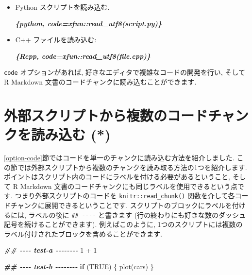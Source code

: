 \documentclass[
  11pt,
]{bxjsreport}
\newenvironment{Shaded}{\begin{snugshade}}{\end{snugshade}}
\newcommand{\ConstantTok}[1]{\textcolor[rgb]{0.00,0.00,0.00}{#1}}
\newcommand{\ControlFlowTok}[1]{\textcolor[rgb]{0.13,0.29,0.53}{\textbf{#1}}}
\newcommand{\DecValTok}[1]{\textcolor[rgb]{0.00,0.00,0.81}{#1}}
\newcommand{\DocumentationTok}[1]{\textcolor[rgb]{0.56,0.35,0.01}{\textbf{\textit{#1}}}}
\newcommand{\FunctionTok}[1]{\textcolor[rgb]{0.00,0.00,0.00}{#1}}
\newcommand{\InformationTok}[1]{\textcolor[rgb]{0.56,0.35,0.01}{\textbf{\textit{#1}}}}
\newcommand{\NormalTok}[1]{#1}
\newcommand{\SpecialCharTok}[1]{\textcolor[rgb]{0.00,0.00,0.00}{#1}}
\begin{document}
\begin{itemize}
\item
  Python スクリプトを読み込む.

\begin{Shaded}
\begin{Highlighting}[]
\InformationTok{\textasciigrave{}\textasciigrave{}\textasciigrave{}\{python, code=xfun::read\_utf8(\textquotesingle{}script.py\textquotesingle{})\}}
\InformationTok{\textasciigrave{}\textasciigrave{}\textasciigrave{}}
\end{Highlighting}
\end{Shaded}
\item
  C++ ファイルを読み込む:

\begin{Shaded}
\begin{Highlighting}[]
\InformationTok{\textasciigrave{}\textasciigrave{}\textasciigrave{}\{Rcpp, code=xfun::read\_utf8(\textquotesingle{}file.cpp\textquotesingle{})\}}
\InformationTok{\textasciigrave{}\textasciigrave{}\textasciigrave{}}
\end{Highlighting}
\end{Shaded}
\end{itemize}

\texttt{code} オプションがあれば, 好きなエディタで複雑なコードの開発を行い, そして R Markdown 文書のコードチャンクに読み込むことができます.

\hypertarget{read-chunk}{%
\section{外部スクリプトから複数のコードチャンクを読み込む (*)}\label{read-chunk}}

\ref{option-code}節ではコードを単一のチャンクに読み込む方法を紹介しました. この節では外部スクリプトから複数のチャンクを読み取る方法の1つを紹介します. ポイントはスクリプト内のコードにラベルを付ける必要があるということ, そして R Markdown 文書のコードチャンクにも同じラベルを使用できるという点です. つまり外部スクリプトのコードを \texttt{knitr::read\_chunk()} 関数を介して各コードチャンクに展開できるということです. スクリプトのブロックにラベルを付けるには, ラベルの後に \texttt{\#\# -\/-\/-\/-} と書きます (行の終わりにも好きな数のダッシュ記号を続けることができます). 例えばこのように, 1つのスクリプトには複数のラベル付けされたブロックを含めることができます.

\begin{Shaded}
\begin{Highlighting}[]
\DocumentationTok{\#\# {-}{-}{-}{-} test{-}a {-}{-}{-}{-}{-}{-}{-}{-}}
\DecValTok{1} \SpecialCharTok{+} \DecValTok{1}

\DocumentationTok{\#\# {-}{-}{-}{-} test{-}b {-}{-}{-}{-}{-}{-}{-}{-}}
\ControlFlowTok{if}\NormalTok{ (}\ConstantTok{TRUE}\NormalTok{) \{}
  \FunctionTok{plot}\NormalTok{(cars)}
\NormalTok{\}}
\end{Highlighting}
\end{Shaded}
\end{document}
